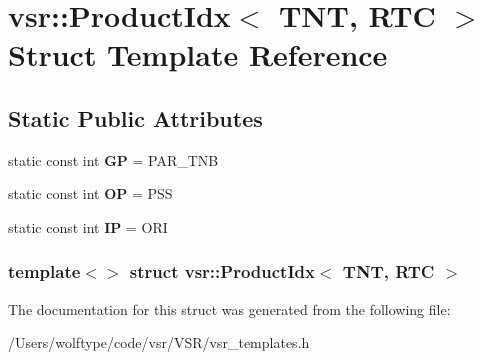 \hypertarget{structvsr_1_1_product_idx_3_01_t_n_t_00_01_r_t_c_01_4}{\section{vsr\-:\-:Product\-Idx$<$ T\-N\-T, R\-T\-C $>$ Struct Template Reference}
\label{structvsr_1_1_product_idx_3_01_t_n_t_00_01_r_t_c_01_4}
}
\subsection*{Static Public Attributes}
\begin{DoxyCompactItemize}
\item 
\hypertarget{structvsr_1_1_product_idx_3_01_t_n_t_00_01_r_t_c_01_4_ac5488146bd9fb1971a3382fda6a842aa}{static const int {\bfseries G\-P} = P\-A\-R\-\_\-\-T\-N\-B}\label{structvsr_1_1_product_idx_3_01_t_n_t_00_01_r_t_c_01_4_ac5488146bd9fb1971a3382fda6a842aa}

\item 
\hypertarget{structvsr_1_1_product_idx_3_01_t_n_t_00_01_r_t_c_01_4_a756defadc21c222bf4b6850442ac0fc8}{static const int {\bfseries O\-P} = P\-S\-S}\label{structvsr_1_1_product_idx_3_01_t_n_t_00_01_r_t_c_01_4_a756defadc21c222bf4b6850442ac0fc8}

\item 
\hypertarget{structvsr_1_1_product_idx_3_01_t_n_t_00_01_r_t_c_01_4_a0d7a33d68191b0ca10fce27aa1022385}{static const int {\bfseries I\-P} = O\-R\-I}\label{structvsr_1_1_product_idx_3_01_t_n_t_00_01_r_t_c_01_4_a0d7a33d68191b0ca10fce27aa1022385}

\end{DoxyCompactItemize}
\subsubsection*{template$<$$>$ struct vsr\-::\-Product\-Idx$<$ T\-N\-T, R\-T\-C $>$}



The documentation for this struct was generated from the following file\-:\begin{DoxyCompactItemize}
\item 
/\-Users/wolftype/code/vsr/\-V\-S\-R/vsr\-\_\-templates.\-h\end{DoxyCompactItemize}
